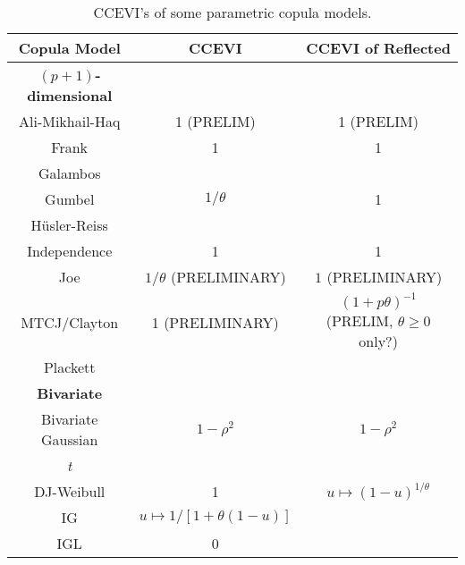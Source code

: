 \documentclass{article}\usepackage[]{graphicx}\usepackage[]{color}
\begin{document}
\begin{table}
\centering
\begin{tabular}{|c|c|c|}
\hline
\textbf{Copula Model} & \textbf{CCEVI} & \textbf{CCEVI of Reflected} \\
\hline
\hline
$(p+1)$\textbf{-dimensional} & & \\
\hline
\hline
Ali-Mikhail-Haq & 1 (PRELIM) & 1 (PRELIM) \\
\hline
Frank & 1 & 1 \\
\hline
Galambos & &  \\
\hline
Gumbel & $1/\theta$ & 1 \\
\hline
H\"{u}sler-Reiss & & \\
\hline
Independence & 1 & 1 \\
\hline
Joe & $1/\theta$ (PRELIMINARY) & $1$ (PRELIMINARY)  \\
\hline
MTCJ/Clayton & 1 (PRELIMINARY) & $(1+p\theta)^{-1}$ (PRELIM, $\theta\geq 0$ only?) \\
\hline
Plackett & & \\
\hline
\hline
\textbf{Bivariate} & & \\
\hline
\hline
Bivariate Gaussian & $1-\rho^{2}$ & $1-\rho^{2}$ \\
\hline
\emph{t} & & \\
\hline
DJ-Weibull & 1  & $u\mapsto\left(1-u\right)^{1/\theta}$ \\
\hline
IG & $u\mapsto1/\left[1+\theta\left(1-u\right)\right]$ &  \\
\hline
IGL & 0 & \\
\hline
\end{tabular}
\caption{
\label{tab:CCEVIs_of_some_cops}
CCEVI's of some  parametric copula models.
}
\end{table}
\end{document}
